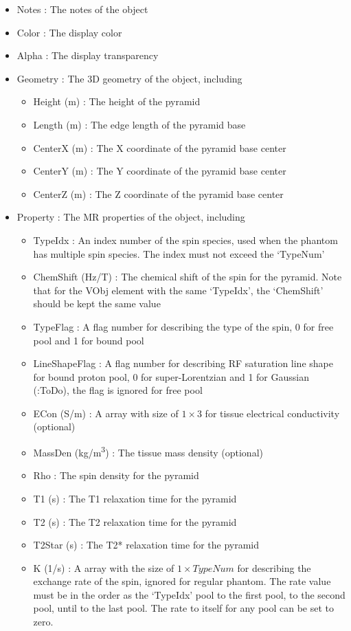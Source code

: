 \documentclass{book}%
\begin{document}
\begin{itemize}
	\item Notes : The notes of the object
	\item Color : The display color
	\item Alpha : The display transparency
	\item Geometry : The 3D geometry of the object, including
	\begin{itemize}
		\item Height (m) : The height of the pyramid
		\item Length (m) : The edge length of the pyramid base
		\item CenterX (m) : The X coordinate of the pyramid base center
		\item CenterY (m) : The Y coordinate of the pyramid base center
		\item CenterZ (m) : The Z coordinate of the pyramid base center
	\end{itemize}
	\item Property : The MR properties of the object, including
	\begin{itemize}
		\item TypeIdx : An index number of the spin species, used when the phantom has multiple spin species. The index must not exceed the `TypeNum'
		\item ChemShift (Hz/T) : The chemical shift of the spin for the pyramid. Note that for the VObj element with the same `TypeIdx', the `ChemShift' should be kept the same value
		\item TypeFlag : A flag number for describing the type of the spin, 0 for free pool and 1 for bound pool
		\item LineShapeFlag : A flag number for describing RF saturation line shape for bound proton pool, 0 for super-Lorentzian and 1 for Gaussian (:ToDo), the flag is ignored for free pool
		\item ECon (S/m) : A array with size of $1 \times 3 $ for tissue electrical conductivity (optional)
		\item MassDen (kg/m\textsuperscript{3}) : The tissue mass density (optional)
		\item Rho : The spin density for the pyramid
		\item T1 (s) : The T1 relaxation time for the pyramid
		\item T2 (s) : The T2 relaxation time for the pyramid
		\item T2Star (s) : The T2* relaxation time for the pyramid
		\item K (1/s) : A array with the size of $1 \times TypeNum$ for describing the exchange rate of the spin, ignored for regular phantom. The rate value must be in the order as the `TypeIdx' pool to the first pool, to the second pool, until to the last pool. The rate to itself for any pool can be set to zero.
	\end{itemize}
\end{itemize}
\end{document}
